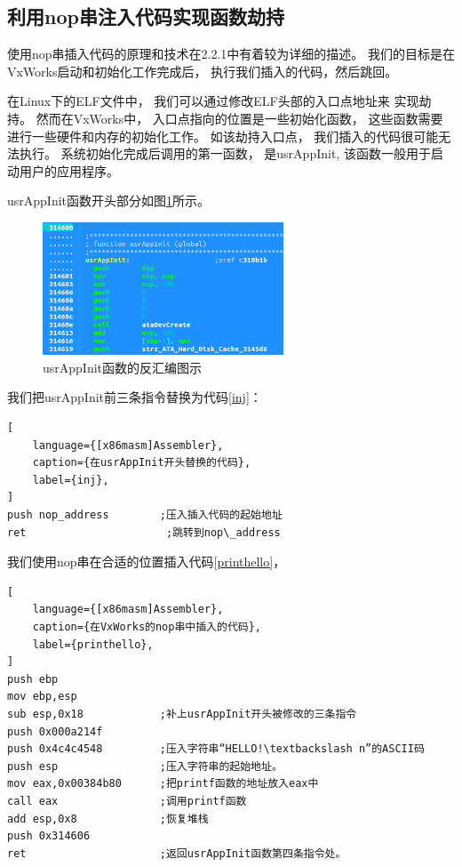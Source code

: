 \subsection{利用nop串注入代码实现函数劫持}

使用nop串插入代码的原理和技术在2.2.1中有着较为详细的描述。
我们的目标是在VxWorks启动和初始化工作完成后，
执行我们插入的代码，然后跳回。

在Linux下的ELF文件中，
我们可以通过修改ELF头部的入口点地址来
实现劫持。
然而在VxWorks中，
入口点指向的位置是一些初始化函数，
这些函数需要进行一些硬件和内存的初始化工作。
如该劫持入口点，
我们插入的代码很可能无法执行。
系统初始化完成后调用的第一函数，
是usrAppInit,
该函数一般用于启动用户的应用程序。

usrAppInit函数开头部分如图\ref{usr}所示。

\begin{figure}[h!]
    \centering
    \includegraphics[width=0.64\textwidth]{figure/usr.png}
    \caption{usrAppInit函数的反汇编图示}
    \label{usr}
\end{figure}

我们把usrAppInit前三条指令替换为代码\ref{inj}：

\begin{lstlisting}[
    language={[x86masm]Assembler},
    caption={在usrAppInit开头替换的代码},
    label={inj},
]
push nop_address        ;压入插入代码的起始地址
ret                      ;跳转到nop\_address
\end{lstlisting}


我们使用nop串在合适的位置插入代码\ref{printhello}，
\begin{lstlisting}[
    language={[x86masm]Assembler},
    caption={在VxWorks的nop串中插入的代码},
    label={printhello},
]
push ebp
mov ebp,esp
sub esp,0x18            ;补上usrAppInit开头被修改的三条指令
push 0x000a214f
push 0x4c4c4548         ;压入字符串“HELLO!\textbackslash n”的ASCII码
push esp                ;压入字符串的起始地址。  
mov eax,0x00384b80      ;把printf函数的地址放入eax中
call eax                ;调用printf函数
add esp,0x8             ;恢复堆栈
push 0x314606        
ret                     ;返回usrAppInit函数第四条指令处。
\end{lstlisting}


